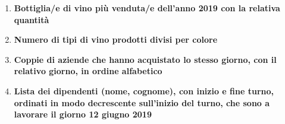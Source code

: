 \begin{enumerate}
	\item \textbf{Bottiglia/e di vino più venduta/e dell'anno 2019 con la relativa quantità}
	\item \textbf{Numero di tipi di vino prodotti divisi per colore}
	\item \textbf{Coppie di aziende che hanno acquistato lo stesso giorno, con il relativo giorno, in ordine alfabetico}
	\item \textbf{Lista dei dipendenti (nome, cognome), con inizio e fine turno, ordinati in modo decrescente sull'inizio del turno, che sono a lavorare il giorno 12 giugno 2019}
	
\end{enumerate}